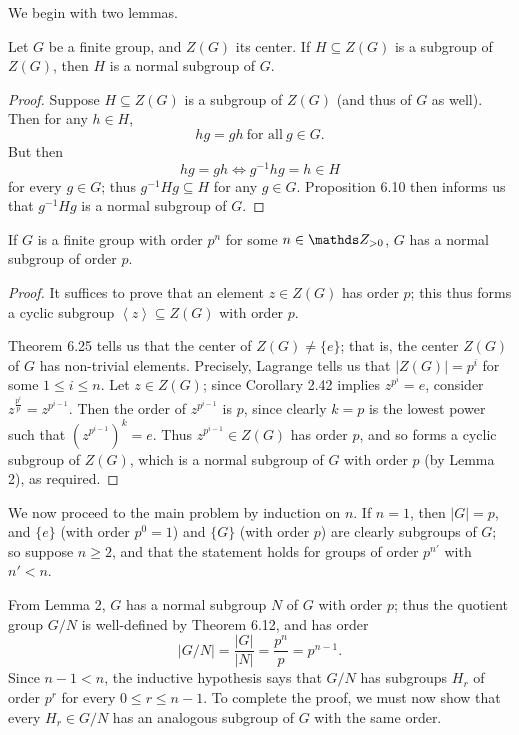\documentclass{homework}
\begin{document}
\begin{solution}
  We begin with two lemmas.
  \begin{lemma}{}
    Let $G$ be a finite group, and $Z(G)$ its center. If $H\subseteq Z(G)$ is a subgroup of $Z(G)$,
    then $H$ is a normal subgroup of $G$.
  \end{lemma}
  \begin{proof}[Proof]
    Suppose $H\subseteq Z(G)$ is a subgroup of $Z(G)$ (and thus of $G$ as well). Then for any $h\in
    H$, \[
      hg=gh~\text{for all}~g\in G
    .\] But then \[
      hg=gh\iff g^{-1}hg=h\in H
    \] for every $g\in G$; thus $g^{-1}Hg\subseteq H$ for any $g\in G$. Proposition 6.10 then
    informs us that $g^{-1}Hg$ is a normal subgroup of $G$.
  \end{proof}
  \begin{lemma}{}
    If $G$ is a finite group with order $p^n$ for some $n\in \Z_{>0}$, $G$ has a normal subgroup of
    order $p$.
  \end{lemma}
  \begin{proof}[Proof]
    It suffices to prove that an element $z\in Z(G)$ has order $p$; this thus forms a cyclic
    subgroup $\left<z \right>\subseteq Z(G)$ with order $p$.

    Theorem 6.25 tells us that the center of $Z(G)\neq \{ e \}$; that is, the center $Z(G)$ of $G$
    has non-trivial elements. Precisely, Lagrange tells us that $\left| Z(G) \right| =p^i$ for some
    $1\le i\le n$. Let $z\in Z(G)$; since Corollary 2.42 implies $z^{p^i}=e$, consider
    $z^{\frac{p^i}{p}}=z^{p^{i-1}}$. Then the order of $z^{p^{i-1}}$ is $p$, since clearly 
    $k=p$ is the lowest power such that $(z^{p^{i-1}})^k=e$. Thus $z^{p^{i-1}}\in Z(G)$ has order
    $p$, and so forms a cyclic subgroup of $Z(G)$, which is a normal subgroup of $G$ with order $p$
    (by Lemma 2), as required.
  \end{proof}

  We now proceed to the main problem by induction on $n$. If $n=1$, then $\left| G \right| =p$, and
  $\{ e \}$ (with order $p^0=1$) and $\{ G \}$ (with order $p$) are clearly subgroups of $G$; so
  suppose $n\ge 2$, and that the statement holds for groups of order $p^{n'}$ with $n'<n$.

  From Lemma 2, $G$ has a normal subgroup $N$ of $G$ with order $p$; thus the quotient group $G /N$
  is well-defined by Theorem 6.12, and has order \[
    \left| G / N \right| =\frac{\left| G \right| }{\left| N \right| }=\frac{p^n}{p}=p^{n-1}
  .\] Since $n-1<n$, the inductive hypothesis says that $G / N$ has subgroups $H_r$ of order $p^r$
  for every $0\le r\le n-1$. To complete the proof, we must now show that every $H_r\in G / N$ has
  an analogous subgroup of $G$ with the same order.


\end{solution}
\end{document}
